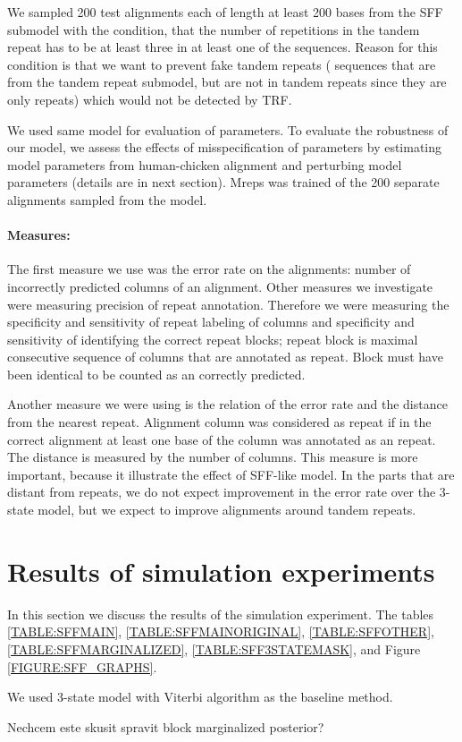 We sampled 200 test alignments each of length at least 200 bases 
from the SFF submodel with the condition, that the number of repetitions in the
tandem repeat has to be at least three in at least one of the sequences. Reason
for this condition is that we want to prevent fake tandem repeats ( sequences
that are from the tandem repeat submodel, but are not in tandem repeats since
they are only repeats) which would not be detected by TRF.

We used same model for evaluation of parameters. To evaluate the robustness of
our model, we assess the effects of misspecification of parameters by
estimating model parameters from human-chicken alignment and perturbing model
parameters (details are in next section). Mreps was trained of the 200 separate
alignments sampled from the model. 

\paragraph{Measures:} The first measure we use was the error rate on the
alignments: number of incorrectly predicted columns of an alignment. Other
measures we investigate were measuring precision of repeat annotation.
Therefore we were measuring the specificity and sensitivity of repeat labeling
of columns and specificity and sensitivity of identifying the correct repeat
blocks; repeat block is maximal consecutive sequence of columns that are
annotated as repeat. Block must have been identical to be counted as an
correctly predicted.

Another measure we were using is the relation of the error rate and the
distance from the nearest repeat. Alignment column was considered as repeat if
in the correct alignment at least one base of the column was annotated as an
repeat. The distance is measured by the number of columns. This measure is more
important, because it illustrate the effect of SFF-like model. In the parts
that are distant from repeats, we do not expect improvement in the error rate
over the 3-state model, but we expect to improve alignments around tandem
repeats. 

\section{Results of simulation experiments}

\begin{reformulate*}
In this section we discuss the results of the simulation experiment. The tables
\ref{TABLE:SFFMAIN}, \ref{TABLE:SFFMAINORIGINAL},
\ref{TABLE:SFFOTHER},\ref{TABLE:SFFMARGINALIZED}, \ref{TABLE:SFF3STATEMASK},
and Figure \ref{FIGURE:SFF_GRAPHS}. 

We used 3-state model with Viterbi algorithm as the baseline method.

Nechcem este skusit spravit block marginalized posterior?
\end{reformulate*}



